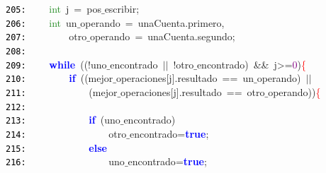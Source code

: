 \documentclass[a4paper,10pt]{scrartcl}
\begin{document}
{   \mbox{}\texttt{\textcolor{Black}{205:}} \ \ \ \ \textcolor{ForestGreen}{int}\ j\ \textcolor{BrickRed}{=}\ pos$\_$escribir\textcolor{BrickRed}{;} \\
   \mbox{}\texttt{\textcolor{Black}{206:}} \ \ \ \ \textcolor{ForestGreen}{int}\ un$\_$operando\ \textcolor{BrickRed}{=}\ unaCuenta\textcolor{BrickRed}{.}primero\textcolor{BrickRed}{,} \\
   \mbox{}\texttt{\textcolor{Black}{207:}} \ \ \ \ \ \ \ \ otro$\_$operando\ \textcolor{BrickRed}{=}\ unaCuenta\textcolor{BrickRed}{.}segundo\textcolor{BrickRed}{;} \\
   \mbox{}\texttt{\textcolor{Black}{208:}} \ \ \ \ \ \ \ \  \\
   \mbox{}\texttt{\textcolor{Black}{209:}} \ \ \ \ \textbf{\textcolor{Blue}{while}}\ \textcolor{BrickRed}{((!}uno$\_$encontrado\ \textcolor{BrickRed}{$|$$|$}\ \textcolor{BrickRed}{!}otro$\_$encontrado\textcolor{BrickRed}{)}\ \textcolor{BrickRed}{\&\&}\ j\textcolor{BrickRed}{\textgreater{}=}\textcolor{Purple}{0}\textcolor{BrickRed}{)}\textcolor{Red}{\{} \\
   \mbox{}\texttt{\textcolor{Black}{210:}} \ \ \ \ \ \ \ \ \textbf{\textcolor{Blue}{if}}\ \textcolor{BrickRed}{((}mejor$\_$operaciones\textcolor{BrickRed}{[}j\textcolor{BrickRed}{].}resultado\ \textcolor{BrickRed}{==}\ un$\_$operando\textcolor{BrickRed}{)}\ \textcolor{BrickRed}{$|$$|$}\  \\
   \mbox{}\texttt{\textcolor{Black}{211:}} \ \ \ \ \ \ \ \ \ \ \ \ \textcolor{BrickRed}{(}mejor$\_$operaciones\textcolor{BrickRed}{[}j\textcolor{BrickRed}{].}resultado\ \textcolor{BrickRed}{==}\ otro$\_$operando\textcolor{BrickRed}{))}\textcolor{Red}{\{} \\
   \mbox{}\texttt{\textcolor{Black}{212:}} \ \ \ \ \ \  \\
   \mbox{}\texttt{\textcolor{Black}{213:}} \ \ \ \ \ \ \ \ \ \ \ \ \textbf{\textcolor{Blue}{if}}\ \textcolor{BrickRed}{(}uno$\_$encontrado\textcolor{BrickRed}{)} \\
   \mbox{}\texttt{\textcolor{Black}{214:}} \ \ \ \ \ \ \ \ \ \ \ \ \ \ \ \ otro$\_$encontrado\textcolor{BrickRed}{=}\textbf{\textcolor{Blue}{true}}\textcolor{BrickRed}{;} \\
   \mbox{}\texttt{\textcolor{Black}{215:}} \ \ \ \ \ \ \ \ \ \ \ \ \textbf{\textcolor{Blue}{else}} \\
   \mbox{}\texttt{\textcolor{Black}{216:}} \ \ \ \ \ \ \ \ \ \ \ \ \ \ \ \ uno$\_$encontrado\textcolor{BrickRed}{=}\textbf{\textcolor{Blue}{true}}\textcolor{BrickRed}{;} \\
}
\end{document}
